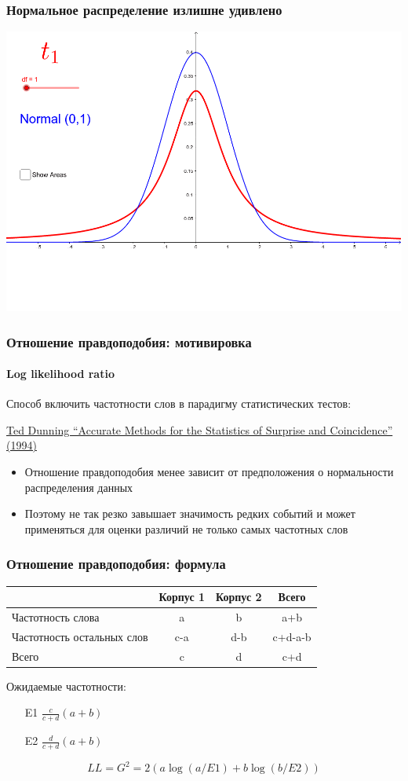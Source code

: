 \documentclass[svgnames]{beamer}
\begin{document}
\begin{frame}
  \frametitle{Нормальное распределение излишне удивлено}
  \centering
  \includegraphics[width=\textwidth]{normal-student}
\end{frame}

\begin{frame}
  \frametitle{Отношение правдоподобия: мотивировка}
  \framesubtitle{Log likelihood ratio}
  Способ включить частотности слов в парадигму статистических тестов:

  \href{https://aclanthology.org/J93-1003.pdf}{Ted Dunning “Accurate
    Methods for the Statistics of Surprise and Coincidence” (1994)}
  \begin{itemize}
  \item Отношение правдоподобия менее зависит от предположения о
    нормальности распределения данных
  \item Поэтому не так резко завышает значимость редких событий и
    может применяться для оценки различий не только самых частотных слов
  \end{itemize}
\end{frame}

\begin{frame}
  \frametitle{Отношение правдоподобия: формула}
  \begin{tabular}[c]{|p{}|c|c|c|}
    \hline
   & Корпус 1 & Корпус 2 & Всего \\
    \hline
    Частотность слова & a & b & a+b \\
    \hline
    Частотность остальных слов & c-a & d-b & c+d-a-b \\
    \hline
    Всего & c & d & c+d \\
    \hline
  \end{tabular}

\bigskip
  Ожидаемые частотности:
  \begin{itemize}
  \item[E1] $\frac{c}{c+d}(a+b)$
  \item[E2] $\frac{d}{c+d}(a+b)$
  \end{itemize}

  \begin{equation}
    LL = G^2 = 2 (a \log (a/E1) + b \log (b/E2) ) 
  \end{equation}
\end{frame}
\end{document}
